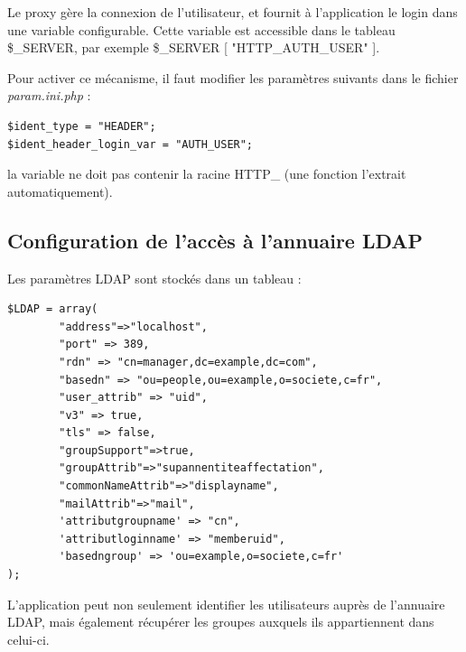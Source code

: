 Le proxy gère la connexion de l'utilisateur, et fournit à l'application le login dans une variable configurable. Cette variable est accessible dans le tableau \$\_SERVER, par exemple \$\_SERVER [ "HTTP\_AUTH\_USER" ].

Pour activer ce mécanisme, il faut modifier les paramètres suivants dans le fichier \textit{param.ini.php} :
\begin{lstlisting}
$ident_type = "HEADER";
$ident_header_login_var = "AUTH_USER";
\end{lstlisting}

la variable ne doit pas contenir la racine HTTP\_ (une fonction l'extrait automatiquement).

\subsection{Configuration de l'accès à l'annuaire LDAP}

Les paramètres LDAP sont stockés dans un tableau :
\begin{lstlisting}
$LDAP = array(
		"address"=>"localhost",
		"port" => 389,
		"rdn" => "cn=manager,dc=example,dc=com",
		"basedn" => "ou=people,ou=example,o=societe,c=fr",
		"user_attrib" => "uid",
		"v3" => true,
		"tls" => false,
		"groupSupport"=>true,
		"groupAttrib"=>"supannentiteaffectation",
		"commonNameAttrib"=>"displayname",
		"mailAttrib"=>"mail",
		'attributgroupname' => "cn",
		'attributloginname' => "memberuid",
		'basedngroup' => 'ou=example,o=societe,c=fr'
);
\end{lstlisting}


L'application peut non seulement identifier les utilisateurs auprès de l'annuaire LDAP, mais également récupérer les groupes auxquels ils appartiennent dans celui-ci.

